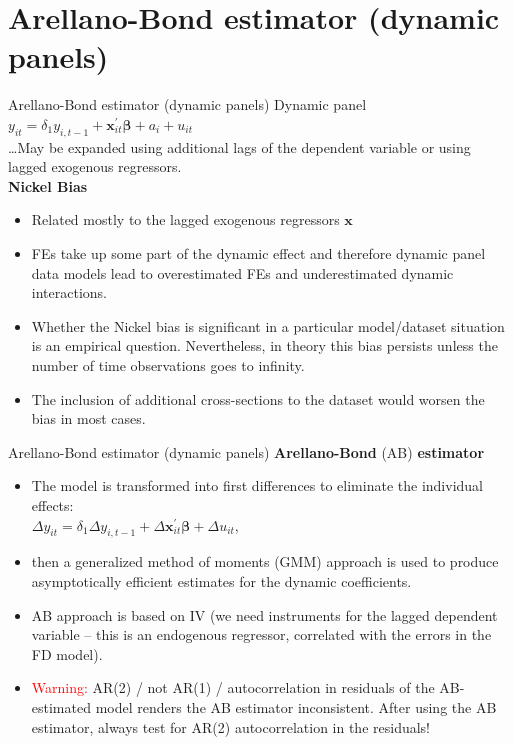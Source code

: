 \documentclass[usenames,dvipsnames]{beamer}
\begin{document}
\section{Arellano-Bond estimator (dynamic panels)}
\begin{frame}{Arellano-Bond estimator (dynamic panels)}
Dynamic panel\\
\medskip
$y_{it} = \delta_1 y_{i,t-1} + \bm{x}^{\prime}_{it} \bm{\beta} + a_i + u_{it}$\\
\medskip
\dots May be expanded using additional lags of the dependent variable or using lagged exogenous regressors.\\
\medskip
\small
\textbf{Nickel Bias}
\begin{itemize}
\item Related mostly to the lagged exogenous regressors $\bm{x}$
\item FEs take up some part of the dynamic effect and therefore dynamic panel data models lead to overestimated FEs and underestimated dynamic interactions. 
\item Whether the Nickel bias is significant in a particular model/dataset situation is an empirical question. Nevertheless, in theory this bias persists unless the number of time observations goes to infinity.
\item The inclusion of additional cross-sections to the dataset would worsen the bias in most cases.
\end{itemize}
\end{frame}
\begin{frame}{Arellano-Bond estimator (dynamic panels)}
\textbf{Arellano-Bond} (AB) \textbf{estimator} 
\begin{itemize}
\item The model is transformed into first differences to eliminate the individual effects:\\
$\Delta y_{it} = \delta_1 \Delta y_{i,t-1} + \Delta \bm{x}^{\prime}_{it} \bm{\beta} + \Delta u_{it}$, 
\item then a generalized method of moments (GMM) approach is used to produce asymptotically efficient estimates for the dynamic coefficients.
\item AB approach is based on IV (we need instruments for the lagged dependent variable – this is an endogenous regressor, correlated with the errors in the FD model).
\item \textcolor{Red}{Warning:} AR(2) / not AR(1) / autocorrelation in residuals of the AB-estimated model renders the AB estimator inconsistent. After using the AB estimator, always test for AR(2) autocorrelation in the residuals!
\end{itemize}
\end{frame}
\end{document}
